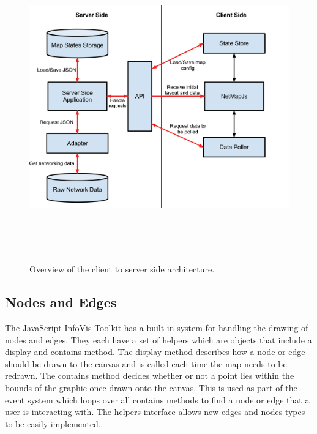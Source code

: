 \documentclass[11pt, a4paper]{article}
\begin{document}
\begin{figure}
\centering
\includegraphics[width=170mm,height=133.26mm]{assets/implementation-overview.pdf}
\caption{Overview of the client to server side architecture.}
\label{fig:implementation-overview}
\end{figure}

\subsection{Nodes and Edges}
\label{sec:nodes-and-edges.impl}

The JavaScript InfoVis Toolkit has a built in system for handling the drawing of
nodes and edges. They each have a set of helpers which are objects that include
a display and contains method. The display method describes how a node or edge
should be drawn to the canvas and is called each time the map needs to be
redrawn. The contains method decides whether or not a point lies within the
bounds of the graphic once drawn onto the canvas. This is used as part of the
event system which loops over all contains methods to find a node or edge that a
user is interacting with. The helpers interface allows new edges and nodes types
to be easily implemented.
\end{document}
